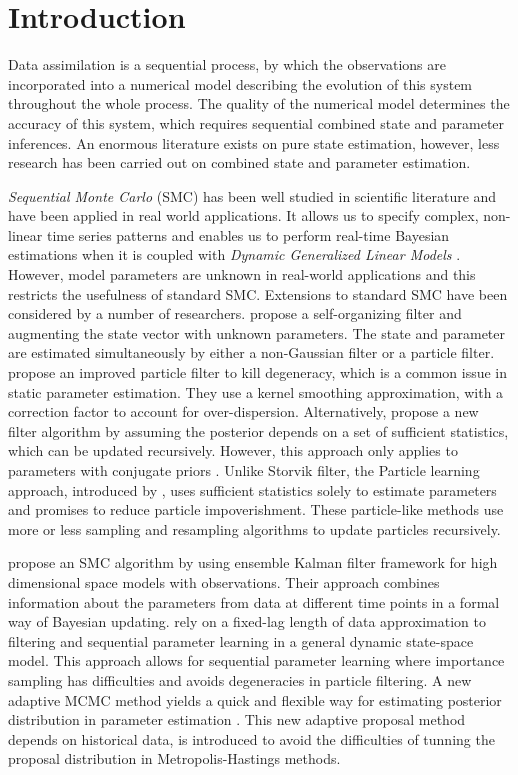 \section{Introduction}

Data assimilation is a sequential process, by which the observations are incorporated into a numerical model describing the evolution of this system throughout the whole process. The quality of the numerical model determines the accuracy of this system, which requires sequential combined state and parameter inferences. An enormous literature exists on pure state estimation, however, less research has been carried out on combined state and parameter estimation.

\textit{Sequential Monte Carlo} (SMC) has been well studied in scientific literature and have been applied in real world applications. It allows us to specify complex, non-linear time series patterns and enables us to perform real-time Bayesian estimations when it is coupled with \textit{Dynamic Generalized Linear Models} \citep{vieira2016online}. However, model parameters are unknown in real-world applications and this restricts the usefulness of standard SMC. Extensions to standard SMC have been considered by a number of researchers. \cite{kitagawa1998self} propose a self-organizing filter and augmenting the state vector with unknown parameters. The state and parameter are estimated simultaneously by either a non-Gaussian filter or a particle filter. \cite{liu2001combined} propose an improved particle filter to kill degeneracy, which is a common issue in static parameter estimation. They use a kernel smoothing approximation, with a correction factor to account for over-dispersion. Alternatively, \cite{storvik2002particle} propose a new filter algorithm by assuming the posterior depends on a set of sufficient statistics, which can be updated recursively. However, this approach only applies to parameters with conjugate priors \citep{stroud2018bayesian}. Unlike Storvik filter, the Particle learning approach, introduced by \cite{carvalho2010particle}, uses sufficient statistics solely to estimate parameters and promises to reduce particle impoverishment. These particle-like methods use more or less sampling and resampling algorithms to update particles recursively. 

\cite{stroud2018bayesian} propose an SMC algorithm by using ensemble Kalman filter framework for high dimensional space models with observations. Their approach combines information about the parameters from data at different time points in a formal way of Bayesian updating. \cite{polson2008practical} rely on a fixed-lag length of data approximation to filtering and sequential parameter learning in a general dynamic state-space model. This approach allows for sequential parameter learning where importance sampling has difficulties and avoids degeneracies in particle filtering. A new adaptive MCMC method yields a quick and flexible way for estimating posterior distribution in parameter estimation \citep{haario1999adaptive}. This new adaptive proposal method depends on historical data, is introduced to avoid the difficulties of tunning the proposal distribution in Metropolis-Hastings methods. 




